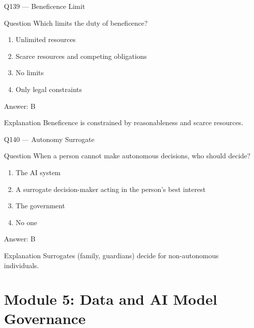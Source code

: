 \documentclass[aspectratio=169,8pt]{beamer}
\begin{document}
	\begin{frame}{Q139 --- Beneficence Limit}
		\begin{block}{Question}
			Which limits the duty of beneficence?
			\begin{enumerate}
				\item Unlimited resources
				\item Scarce resources and competing obligations
				\item No limits
				\item Only legal constraints
			\end{enumerate}
		\end{block}
		\begin{exampleblock}{Answer: B}\end{exampleblock}
		\begin{block}{Explanation}
			Beneficence is constrained by reasonableness and scarce resources.
		\end{block}
	\end{frame}
	
	\begin{frame}{Q140 --- Autonomy Surrogate}
		\begin{block}{Question}
			When a person cannot make autonomous decisions, who should decide?
		\end{block}
		\begin{enumerate}
			\item The AI system
			\item A surrogate decision-maker acting in the person's best interest
			\item The government
			\item No one
		\end{enumerate}
		\begin{exampleblock}{Answer: B}\end{exampleblock}
		\begin{block}{Explanation}
			Surrogates (family, guardians) decide for non-autonomous individuals.
		\end{block}
	\end{frame}
	
	\section{Module 5: Data and AI Model Governance}
	
\end{document}
